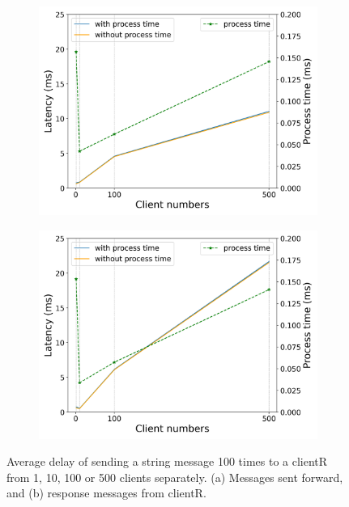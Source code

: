 \begin{figure}[htb]
    \begin{subfigure}[b]{0.49\textwidth}
        \centering
        \includegraphics[width=\textwidth]{figures/tests/proportional_tests/Average_string_messages_sending_time_of_100_tests_of_diff_client_numbers.png}\hfill 
        \caption{} \label{fig: proportional-clients-a}
    \end{subfigure}
    \begin{subfigure}[b]{0.49\textwidth}
        \centering
        \includegraphics[width=\textwidth]{figures/tests/proportional_tests/Average_string_messages_receiving_time_of_100_tests_of_diff_client_numbers.png}\hfill 
        \caption{} \label{fig: proportional-clients-b}
        \end{subfigure}

    \caption{Average delay of sending a string message 100 times 
    to a clientR from 1, 10, 100 or 500 clients separately. (a) Messages sent forward, 
    and (b) response messages from clientR. 
    \label{fig: proportional-clients}}
\end{figure}


